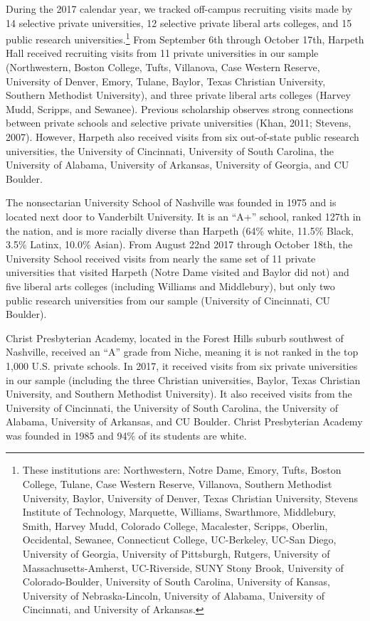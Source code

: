 \documentclass[
  12pt,
]{article}
\begin{document}
During the 2017 calendar year, we tracked off-campus recruiting visits made by 14 selective private universities, 12 selective private liberal arts colleges, and 15 public research universities.\footnote{These institutions are: Northwestern, Notre Dame, Emory, Tufts, Boston College, Tulane, Case Western Reserve, Villanova, Southern Methodist University, Baylor, University of Denver, Texas Christian University, Stevens Institute of Technology, Marquette, Williams, Swarthmore, Middlebury, Smith, Harvey Mudd, Colorado College, Macalester, Scripps, Oberlin, Occidental, Sewanee, Connecticut College, UC-Berkeley, UC-San Diego, University of Georgia, University of Pittsburgh, Rutgers, University of Massachusetts-Amherst, UC-Riverside, SUNY Stony Brook, University of Colorado-Boulder, University of South Carolina, University of Kansas, University of Nebraska-Lincoln, University of Alabama, University of Cincinnati, and University of Arkansas.} From September 6th through October 17th, Harpeth Hall received recruiting visits from 11 private universities in our sample (Northwestern, Boston College, Tufts, Villanova, Case Western Reserve, University of Denver, Emory, Tulane, Baylor, Texas Christian University, Southern Methodist University), and three private liberal arts colleges (Harvey Mudd, Scripps, and Sewanee). Previous scholarship observes strong connections between private schools and selective private universities (Khan, 2011; Stevens, 2007). However, Harpeth also received visits from six out-of-state public research universities, the University of Cincinnati, University of South Carolina, the University of Alabama, University of Arkansas, University of Georgia, and CU Boulder.

The nonsectarian University School of Nashville was founded in 1975 and is located next door to Vanderbilt University. It is an ``A+'' school, ranked 127th in the nation, and is more racially diverse than Harpeth (64\% white, 11.5\% Black, 3.5\% Latinx, 10.0\% Asian). From August 22nd 2017 through October 18th, the University School received visits from nearly the same set of 11 private universities that visited Harpeth (Notre Dame visited and Baylor did not) and five liberal arts colleges (including Williams and Middlebury), but only two public research universities from our sample (University of Cincinnati, CU Boulder).

Christ Presbyterian Academy, located in the Forest Hills suburb southwest of Nashville, received an ``A'' grade from Niche, meaning it is not ranked in the top 1,000 U.S. private schools. In 2017, it received visits from six private universities in our sample (including the three Christian universities, Baylor, Texas Christian University, and Southern Methodist University). It also received visits from the University of Cincinnati, the University of South Carolina, the University of Alabama, University of Arkansas, and CU Boulder. Christ Presbyterian Academy was founded in 1985 and 94\% of its students are white.
\end{document}
